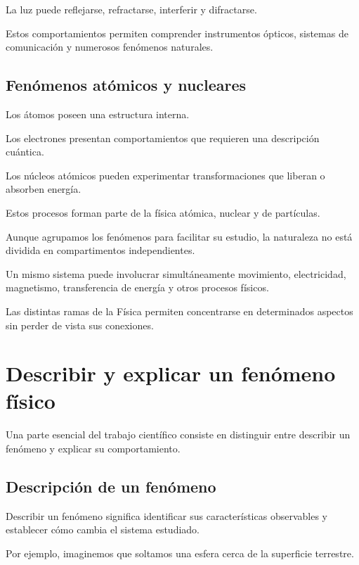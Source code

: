 La luz puede reflejarse, refractarse, interferir
y difractarse.

Estos comportamientos permiten comprender instrumentos
ópticos, sistemas de comunicación y numerosos
fenómenos naturales.

\subsection{Fenómenos atómicos y nucleares}

Los átomos poseen una estructura interna.

Los electrones presentan comportamientos que requieren
una descripción cuántica.

Los núcleos atómicos pueden experimentar transformaciones
que liberan o absorben energía.

Estos procesos forman parte de la física atómica,
nuclear y de partículas.

\begin{interpretacion}

Aunque agrupamos los fenómenos para facilitar su estudio,
la naturaleza no está dividida en compartimentos independientes.

Un mismo sistema puede involucrar simultáneamente
movimiento, electricidad, magnetismo, transferencia
de energía y otros procesos físicos.

Las distintas ramas de la Física permiten concentrarse
en determinados aspectos sin perder de vista sus conexiones.

\end{interpretacion}


\section{Describir y explicar un fenómeno físico}

Una parte esencial del trabajo científico consiste en distinguir
entre describir un fenómeno y explicar su comportamiento.

\subsection{Descripción de un fenómeno}

Describir un fenómeno significa identificar sus características
observables y establecer cómo cambia el sistema estudiado.

Por ejemplo, imaginemos que soltamos una esfera cerca
de la superficie terrestre.


